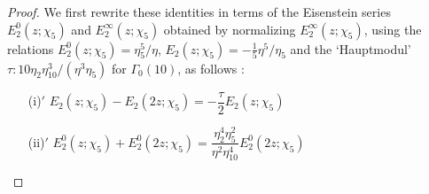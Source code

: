 \begin{proof}
We first rewrite these identities in terms of the Eisenstein series $E^{0}_{2}(z;\chi_{5})$ and $E^{\infty}_{2}(z;\chi_{5})$ obtained by normalizing $E^{\infty}_{2}(z;\chi_{5})$, using the relations $E^{0}_{2}(z;\chi_{5})=\eta^{5}_{5}/\eta$, $E_{2}(z;\chi_{5})=-\frac{1}{5}\eta^{5}/\eta_{5}$ and the `Hauptmodul' $\tau : 10\eta_{2}\eta^{3}_{10}/(\eta^{3}\eta_{5})$ for $\Gamma_{0}(10)$, as follows :
\begin{itemize}
\item[(i)$'$] $E_{2}(z;\chi_{5})-E_{2}(2z;\chi_{5})=-\dfrac{\tau}{2}E_{2}(z;\chi_{5})$

\item[(ii)$'$] $E^{0}_{2}(z;\chi_{5})+E^{0}_{2}(2z;\chi_{5})=\dfrac{\eta^{4}_{2}\eta^{2}_{5}}{\eta^{2}\eta^{4}_{10}}E^{0}_{2}(2z;\chi_{5})$
\end{itemize}
\end{proof}


